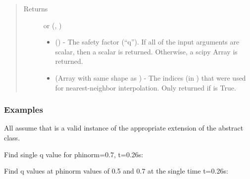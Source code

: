 \documentclass[letterpaper,10pt,english]{sphinxmanual}
\begin{document}
\begin{fulllineitems}
\begin{fulllineitems}
\begin{quote}
\begin{description}
\begin{itemize}
\end{itemize}

\item[{Returns}] \leavevmode

 or (, )
\begin{itemize}
\item {} 
 () - The safety factor (“q”). If
all of the input arguments are scalar, then a scalar is returned.
Otherwise, a scipy Array is returned.

\item {} 
 (Array with same shape as ) - The indices
(in ) that were used for
nearest-neighbor interpolation. Only returned if  is
True.

\end{itemize}


\end{description}\end{quote}
\subsubsection*{Examples}

All assume that  is a valid instance of the appropriate
extension of the {\hyperref[\detokenize{eqtools:eqtools.core.Equilibrium}]{}} abstract class.

Find single q value for phinorm=0.7, t=0.26s:

\begin{sphinxVerbatim}[commandchars=\\\{\}]
   
\end{sphinxVerbatim}

Find q values at phinorm values of 0.5 and 0.7 at the single time
t=0.26s:

\begin{sphinxVerbatim}[commandchars=\\\{\}]
  \PYG{p}{[} \PYG{p}{]} 
\end{sphinxVerbatim}


\end{fulllineitems}
\end{fulllineitems}
\end{document}
